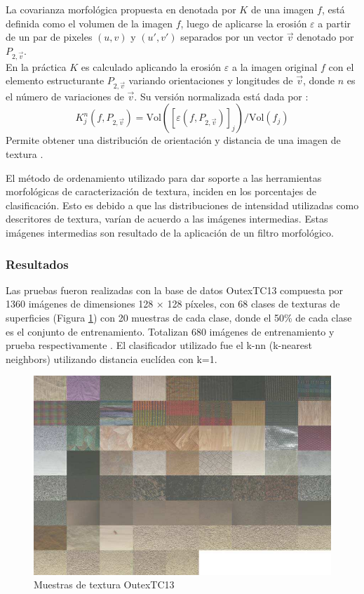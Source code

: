 La covarianza morfológica propuesta en \cite{matheron1975random,maragos1989pattern} denotada por $K$ de una imagen $f$, está definida como el volumen de la imagen $f$, luego de aplicarse la erosión $\varepsilon$ a partir de un par de pixeles $(u,v)$ y  $(u',v')$ separados por un vector $\vec{v}$ denotado por $P_{2,\vec{v}}$.\\
En la práctica $K $ es calculado aplicando la erosión $\varepsilon$ a la imagen original $f$ con el elemento estructurante $P_{2,\vec{v}}$ variando orientaciones y longitudes de $\vec{v}$, donde $n$ es el número de variaciones de $\vec{v}$. Su versión normalizada está dada por :
\begin{equation}
K^{n}_{j}(f,P_{2,\vec{v}})  = \mathrm{Vol}([\varepsilon(f,P_{2,\vec{v}})]_{j}) / \mathrm{Vol}(f_{j})
\end{equation}
Permite obtener una distribución de orientación y distancia de una imagen de textura \cite{aptoula2007morphological}.

El método de ordenamiento utilizado para dar soporte a las herramientas morfológicas de caracterización de textura, inciden en los porcentajes de clasificación. Esto es debido a que las distribuciones de intensidad utilizadas como descritores de textura, varían de acuerdo a las imágenes intermedias. Estas imágenes intermedias son resultado de la aplicación de un filtro morfológico.

\subsubsection{Resultados}
\label{sec:resultadosexperi}
Las pruebas fueron realizadas con la base de datos OutexTC13 compuesta por 1360 imágenes de dimensiones 128 $\times $ 128 píxeles, con 68 clases de texturas de superficies (Figura \ref{fig:outex13}) con 20 muestras de cada clase, donde el 50\% de cada clase es el conjunto de entrenamiento. Totalizan 680 imágenes de entrenamiento y prueba respectivamente \cite{ojala2002outex}.  
El clasificador utilizado fue el k-nn (k-nearest neighbors) utilizando distancia euclídea con k=1. 

\begin{figure}
	\centering
		\includegraphics[scale=0.25]{fig/outex13.png}
	\caption{Muestras de textura OutexTC13}
	\label{fig:outex13}
\end{figure}


